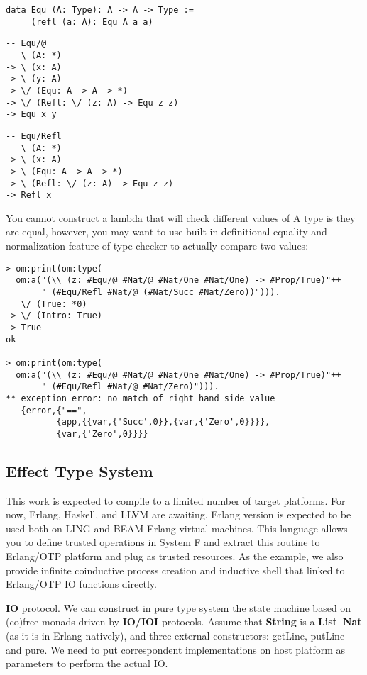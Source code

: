 \documentclass{article}
\begin{document}
\begin{lstlisting}
data Equ (A: Type): A -> A -> Type :=
     (refl (a: A): Equ A a a)
\end{lstlisting}

\begin{lstlisting}
-- Equ/@
   \ (A: *)
-> \ (x: A)
-> \ (y: A)
-> \/ (Equ: A -> A -> *)
-> \/ (Refl: \/ (z: A) -> Equ z z)
-> Equ x y
\end{lstlisting}

\begin{lstlisting}
-- Equ/Refl
   \ (A: *)
-> \ (x: A)
-> \ (Equ: A -> A -> *)
-> \ (Refl: \/ (z: A) -> Equ z z)
-> Refl x
\end{lstlisting}

You cannot construct a lambda that will check different values of A type is they are equal,
however, you may want to use built-in definitional equality and
normalization feature of type checker to actually compare two values:

\begin{lstlisting}[mathescape=true]
> om:print(om:type(
  om:a("(\\ (z: #Equ/@ #Nat/@ #Nat/One #Nat/One) -> #Prop/True)"++
       " (#Equ/Refl #Nat/@ (#Nat/Succ #Nat/Zero))"))).
   \/ (True: *0)
-> \/ (Intro: True)
-> True
ok

> om:print(om:type(
  om:a("(\\ (z: #Equ/@ #Nat/@ #Nat/One #Nat/One) -> #Prop/True)"++
       " (#Equ/Refl #Nat/@ #Nat/Zero)"))).
** exception error: no match of right hand side value
   {error,{"==",
          {app,{{var,{'Succ',0}},{var,{'Zero',0}}}},
          {var,{'Zero',0}}}}
\end{lstlisting}

\subsection{Effect Type System}
This work is expected to compile to a limited number of target platforms.
For now, Erlang, Haskell, and LLVM are awaiting.
Erlang version is expected to be used both on LING and BEAM Erlang virtual machines.
This language allows you to define trusted operations in System F and extract this routine to Erlang/OTP platform and plug as trusted resources.
As the example, we also provide infinite coinductive process creation and inductive shell that linked to Erlang/OTP IO functions directly.

{\bf IO} protocol.
We can construct in pure type system the state machine based on (co)free monads driven by {\bf IO/IOI} protocols.
Assume that {\bf String} is a {\bf List\ Nat} (as it is in Erlang natively), and three external constructors: getLine, putLine and pure.
We need to put correspondent implementations on host platform as parameters to perform the actual IO.
\end{document}
